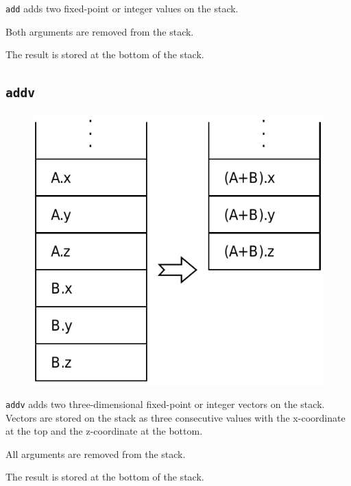 			\texttt{add} adds two fixed-point or integer values on the stack.
			
			Both arguments are removed from the stack.
			
			The result is stored at the bottom of the stack.
	
	\qquad
	
	\subsection*{\texttt{addv}}
	
		\begin{figure}
			\begin{flushright}
				\includegraphics[width=\linewidth]{figure/pdf/i_addv} 
			\end{flushright}
		\end{figure}
	
			\texttt{addv} adds two three-dimensional fixed-point or integer
			vectors on the stack. Vectors are stored on the stack as three
			consecutive values with the x-coordinate at the top and the
			z-coordinate at the bottom.
			
			All arguments are removed from the stack.
			
			The result is stored at the bottom of the stack.  \\
			\\
			\\

